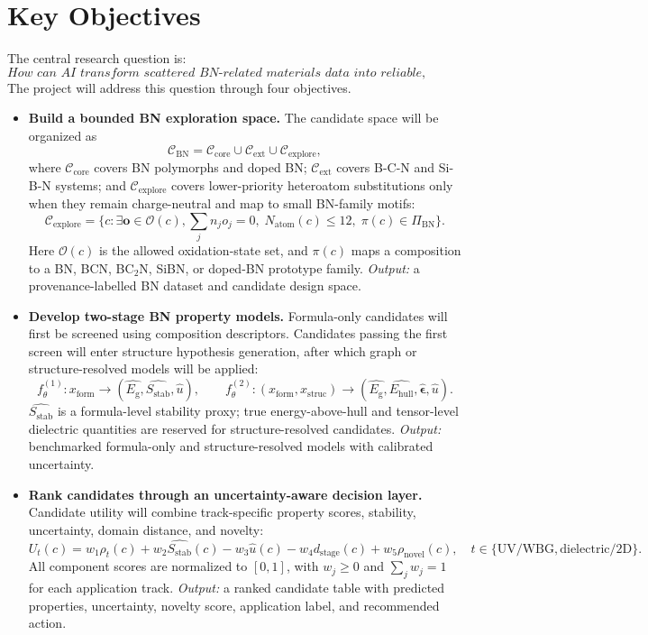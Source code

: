 \documentclass[10pt,a4paper]{article}
\newcommand{\eg}{E_{\mathrm{g}}}
\newcommand{\ehull}{E_{\mathrm{hull}}}
\newcommand{\form}{x_{\mathrm{form}}}
\newcommand{\struc}{x_{\mathrm{struc}}}
\newcommand{\unc}{u}
\newcommand{\stab}{S_{\mathrm{stab}}}
\newcommand{\utility}{U}
\newcommand{\novel}{\rho_{\mathrm{novel}}}
\begin{document}
\section{Key Objectives}
The central research question is:
\[
  \textit{How can AI transform scattered BN-related materials data into reliable, uncertainty-aware research decisions?}
\]
The project will address this question through four objectives.
\begin{itemize}[leftmargin=*]
  \item \textbf{Build a bounded BN exploration space.} The candidate space will be organized as
  \[
    \mathcal{C}_{\mathrm{BN}}=
    \mathcal{C}_{\mathrm{core}}\cup\mathcal{C}_{\mathrm{ext}}\cup\mathcal{C}_{\mathrm{explore}},
  \]
  where $\mathcal{C}_{\mathrm{core}}$ covers BN polymorphs and doped BN;
  $\mathcal{C}_{\mathrm{ext}}$ covers B-C-N and Si-B-N systems; and
  $\mathcal{C}_{\mathrm{explore}}$ covers lower-priority heteroatom substitutions only when they remain charge-neutral and map to small BN-family motifs:
  \[
    \mathcal{C}_{\mathrm{explore}}=
    \{c:\exists \mathbf{o}\in\mathcal{O}(c),\sum_j n_j o_j=0,\;
    N_{\mathrm{atom}}(c)\le 12,\;\pi(c)\in\Pi_{\mathrm{BN}}\}.
  \]
  Here $\mathcal{O}(c)$ is the allowed oxidation-state set, and $\pi(c)$ maps a composition to a BN, BCN, BC$_2$N, SiBN, or doped-BN prototype family.
  \textit{Output:} a provenance-labelled BN dataset and candidate design space.

  \item \textbf{Develop two-stage BN property models.} Formula-only candidates will first be screened using composition descriptors. Candidates passing the first screen will enter structure hypothesis generation, after which graph or structure-resolved models will be applied:
  \[
    f_{\theta}^{(1)}:\form\rightarrow(\hat{\eg},\hat{\stab},\hat{\unc}),
    \qquad
    f_{\theta}^{(2)}:(\form,\struc)\rightarrow
    (\hat{\eg},\hat{\ehull},\hat{\boldsymbol{\epsilon}},\hat{\unc}).
  \]
  $\hat{\stab}$ is a formula-level stability proxy; true energy-above-hull and tensor-level dielectric quantities are reserved for structure-resolved candidates.
  \textit{Output:} benchmarked formula-only and structure-resolved models with calibrated uncertainty.

  \item \textbf{Rank candidates through an uncertainty-aware decision layer.} Candidate utility will combine track-specific property scores, stability, uncertainty, domain distance, and novelty:
  \[
    \utility_t(c)=w_1\rho_t(c)+w_2\hat{\stab}(c)-w_3\hat{\unc}(c)
    -w_4 d_{\mathrm{stage}}(c)+w_5\novel(c),\quad
    t\in\{\mathrm{UV/WBG},\mathrm{dielectric/2D}\}.
  \]
  All component scores are normalized to $[0,1]$, with $w_j\ge0$ and $\sum_j w_j=1$ for each application track.
  \textit{Output:} a ranked candidate table with predicted properties, uncertainty, novelty score, application label, and recommended action.


\end{itemize}
\end{document}

